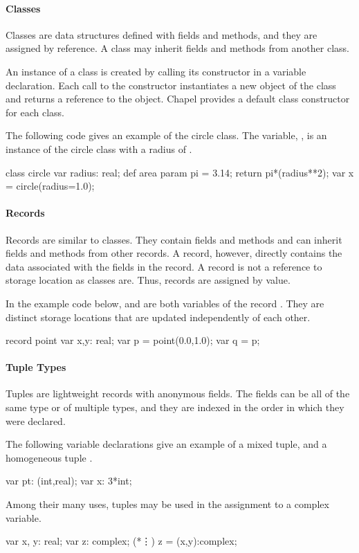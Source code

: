 \paragraph{Classes}
Classes are data structures defined with fields and methods, and
they are assigned by reference.  A class may inherit fields and
methods from another class.  

An instance of a class is created by calling its constructor
in a variable declaration.  Each call to the constructor
instantiates a new object of the class and returns a reference to 
the object.  Chapel provides a default class constructor for each class.

\begin{example}
The following code gives an example of the circle class.  
The variable, , is an instance of the circle class with
a radius of .
\begin{chapel}
class circle {
  var radius: real;
  def area {
    param pi = 3.14;
    return pi*(radius**2);
  }
}
var x = circle(radius=1.0);
\end{chapel}
\end{example}

\paragraph{Records}
Records are similar to classes.  They contain fields and methods
and can inherit fields and methods from other records.  A record,
however, directly contains the data associated with the fields
in the record.  A record is not a reference to storage location as
classes are.  Thus, records are assigned by value.  

\begin{example}
In the example code below,  and  are both
variables of the record .  They are distinct storage
locations that are updated independently of each other.

\begin{chapel}
record point {
  var x,y: real;
}
var p = point(0.0,1.0);
var q = p;
\end{chapel}
\end{example}

\paragraph{Tuple Types}
Tuples are lightweight records with anonymous fields.
The fields can be all of the same type or of multiple types, and
they are indexed in the order in which they were declared.
\begin{example}
The following variable declarations give an example of a mixed tuple,
 and a homogeneous tuple .
\begin{chapel}
var pt: (int,real);
var x: 3*int;
\end{chapel}

Among their many uses, tuples may be used in the assignment to a
complex variable.
\begin{chapel}
var x, y: real;
var z: complex;
(*\vdots*)
z = (x,y):complex;
\end{chapel}
\end{example}


